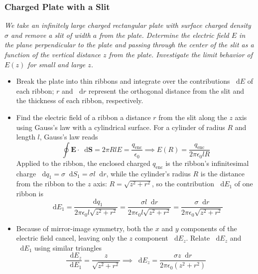 \documentclass[11pt, a4paper]{article}
\newcommand{\diff}{\mathop{}\!\mathrm{d}} %
\renewcommand{\vec}[1]{\bm{#1}} %
\begin{document}
\subsubsection{Charged Plate with a Slit}
\textit{We take an infinitely large charged rectangular plate with surface charged density $ \sigma $ and remove a slit of width $ a $ from the plate. Determine the electric field $ E $ in the plane perpendicular to the plate and passing through the center of the slit as a function of the vertical distance $ z $ from the plate. Investigate the limit behavior of $ E(z) $ for small and large $ z $.}
\begin{itemize}
	\item Break the plate into thin ribbons and integrate over the contributions $ \diff E $ of each ribbon; $ r $ and $ \diff r $ represent the orthogonal distance from the slit and the thickness of each ribbon, respectively.
	
	\item Find the electric field of a ribbon a distance $ r $ from the slit along the $ z $ axis using Gauss's law with a cylindrical surface. For a cylinder of radius $ R $ and length $ l $, Gauss's law reads
	\begin{equation*}
		\oint \vec{E} \cdot \diff \vec{S} = 2\pi R l E = \frac{q_{\text{enc}}}{\epsilon_{0}} \implies E(R) = \frac{q_{\text{enc}}}{2\pi \epsilon_{0} l R}
	\end{equation*}
	Applied to the ribbon, the enclosed charged $ q_{\text{enc}} $ is the ribbon's infinitesimal charge $ \diff q_{1} = \sigma \diff S_{1} = \sigma l \diff r $, while the cylinder's radius $ R $ is the distance from the ribbon to the $ z $ axis: $ R = \sqrt{z^{2} + r^{2}} $, so the contribution $ \diff E_{1} $ of one ribbon is
	\begin{equation*}
		\diff E_{1} = \frac{\diff q_{1}}{2\pi \epsilon_{0} l \sqrt{z^{2} + r^{2}}} = \frac{\sigma l \diff r}{2\pi \epsilon_{0} l\sqrt{z^{2} + r^{2}} } = \frac{\sigma \diff r}{2\pi \epsilon_{0} \sqrt{z^{2} + r^{2}} }
	\end{equation*}
	
	\item Because of mirror-image symmetry, both the $ x $ and $ y $ components of the electric field cancel, leaving only the $ z $ component $ \diff E_{z} $. Relate $ \diff E_{z} $ and $ \diff E_{1} $ using similar triangles
	\begin{equation*}
		\frac{\diff E_{z}}{\diff E_{1}} = \frac{z}{\sqrt{z^{2} + r^{2}}} \implies  \diff E_{z} = \frac{\sigma z \diff r}{2\pi \epsilon_{0} (z^{2} + r^{2})}
	\end{equation*}
	

\end{itemize}
\end{document}
